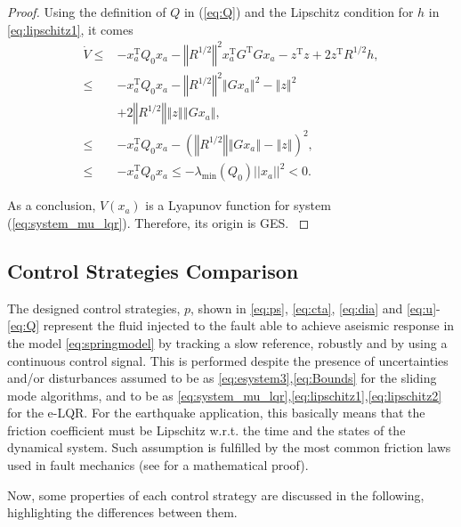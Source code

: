 \documentclass[journal,twoside,web]{ieeecolor}
\begin{document}
\begin{proof}
Using the definition of $Q$ in (\ref{eq:Q}) and the Lipschitz condition for $h$ in \eqref{eq:lipschitz1}, it comes
\begin{equation}
\begin{split}
\dot{V} \leq &- x_a^{\mathrm{T}} Q_0 x_a - \left\Vert R^{1/2} \right\Vert^2 x_a^{\mathrm{T}} G^{\text{T}} Gx_a - z^{\mathrm{T}}  z + 2 z^{\mathrm{T}} R^{1/2} h, \\
\leq &- x_a^{\mathrm{T}} Q_0 x_a - \left\Vert R^{1/2} \right\Vert^2 \left\Vert Gx_a \right\Vert^2 - \left\Vert z \right\Vert^2 \\ & + 2 \left\Vert R^{1/2} \right\Vert \left\Vert z \right\Vert \left\Vert Gx_a \right\Vert, \\
\leq &- x_a^{\mathrm{T}} Q_0 x_a - \left( \left\Vert R^{1/2} \right\Vert \left\Vert Gx_a \right\Vert - \left\Vert z \right\Vert \right)^2, \\
\leq &- x_a^{\mathrm{T}} Q_0 x_a \leq -\lambda_{\text{min}}(Q_0) ||x_a||^2 < 0.
\end{split}
\end{equation}

As a conclusion, $V(x_a)$ is a Lyapunov function for system (\ref{eq:system_mu_lqr}). Therefore, its origin is GES. %
\label{pr:eLQR}
\end{proof}

\subsection{Control Strategies Comparison}

The designed control strategies, $p$, shown in \eqref{eq:ps}, \eqref{eq:cta}, \eqref{eq:dia} and \eqref{eq:u}-\eqref{eq:Q} represent the fluid injected to the fault able to achieve aseismic response in the model \eqref{eq:springmodel} by tracking a slow reference, robustly and by using a continuous control signal. This is performed despite the presence of uncertainties and/or disturbances assumed to be as \eqref{eq:esystem3},\eqref{eq:Bounds} for the sliding mode algorithms, and to be as \eqref{eq:system_mu_lqr},\eqref{eq:lipschitz1},\eqref{eq:lipschitz2} for the e-LQR. For the earthquake application, this basically means that the friction coefficient must be Lipschitz w.r.t. the time and the states of the dynamical system. Such assumption is fulfilled by the most common friction laws used in fault mechanics (see \cite{b:https://doi.org/10.1029/2021JB023410} for a mathematical proof).

Now, some properties of each control strategy are discussed in the following, highlighting the differences between them.
\end{document}
